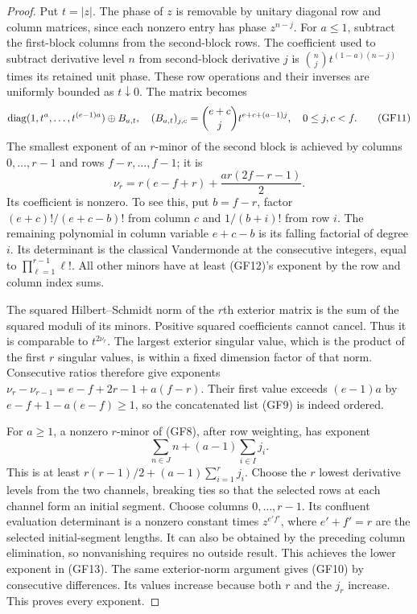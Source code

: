 \documentclass[11pt]{article}
\begin{document}
\begin{proof}
Put $t=|z|$. The phase of $z$ is removable by unitary diagonal row and
column matrices, since each nonzero entry has phase $z^{n-j}$.
For $a\le1$, subtract the first-block columns from the second-block
rows. The coefficient used to subtract derivative level $n$ from
second-block derivative $j$ is
$\binom nj t^{(1-a)(n-j)}$ times its retained unit phase. These row
operations and their inverses are uniformly bounded as $t\downarrow0$.
The matrix becomes
\[
\operatorname{diag}(1,t^a,\ldots,t^{(e-1)a})\oplus B_{a,t},\quad
(B_{a,t})_{j,c}=\binom{e+c}j
t^{e+c+(a-1)j},\quad 0\le j,c<f.
\tag{GF11}
\]
The smallest exponent of an $r$-minor of the second block is achieved
by columns $0,\ldots,r-1$ and rows $f-r,\ldots,f-1$; it is
\[
\nu_r=r(e-f+r)+\frac{ar(2f-r-1)}2.
\tag{GF12}
\]
Its coefficient is nonzero. To see this, put $b=f-r$, factor
$(e+c)!/(e+c-b)!$ from column $c$ and $1/(b+i)!$ from row $i$.
The remaining polynomial in column variable $e+c-b$ is its falling
factorial of degree $i$. Its determinant is the classical Vandermonde
\cite{GFVandermonde} at the
consecutive integers, equal to $\prod_{\ell=1}^{r-1}\ell!$.
All other minors have at least (GF12)'s exponent by the row and column
index sums.

The squared Hilbert--Schmidt norm of the $r$th exterior matrix is the
sum of the squared moduli of its minors. Positive squared coefficients
cannot cancel. Thus it is comparable to $t^{2\nu_r}$. The largest
exterior singular value, which is the product of the first $r$
singular values, is within a fixed dimension factor of that norm.
Consecutive ratios therefore give exponents
$\nu_r-\nu_{r-1}=e-f+2r-1+a(f-r)$.
Their first value exceeds $(e-1)a$ by
$e-f+1-a(e-f)\ge1$, so the concatenated list (GF9) is indeed ordered.

For $a\ge1$, a nonzero $r$-minor of (GF8), after row weighting, has
exponent
\[
\sum_{n\in J}n+(a-1)\sum_{i\in I}j_i.
\tag{GF13}
\]
This is at least $r(r-1)/2+(a-1)\sum_{i=1}^rj_i$.
Choose the $r$ lowest derivative levels from the two channels, breaking
ties so that the selected rows at each channel form an initial segment.
Choose columns $0,\ldots,r-1$. Its confluent evaluation determinant
is a nonzero constant times $z^{e'f'}$, where $e'+f'=r$ are the selected
initial-segment lengths. It can also be obtained by the preceding
column elimination, so nonvanishing requires no outside result.
This achieves the lower exponent in (GF13). The same exterior-norm
argument gives (GF10) by consecutive differences. Its values increase
because both $r$ and the $j_r$ increase. This proves every exponent.
\end{proof}
\end{document}
